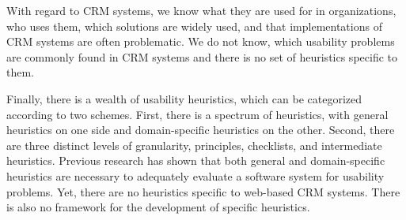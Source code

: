 With regard to CRM systems, we know what they are used for in organizations, who uses them, which solutions are widely used, and that implementations of CRM systems are often problematic. We do not know, which usability problems are commonly found in CRM systems and there is no set of heuristics specific to them.

Finally, there is a wealth of usability heuristics, which can be categorized according to two schemes. First, there is a spectrum of heuristics, with general heuristics on one side and domain-specific heuristics on the other. Second, there are three distinct levels of granularity, principles, checklists, and intermediate heuristics. Previous research has shown that both general and domain-specific heuristics are necessary to adequately evaluate a software system for usability problems. Yet, there are no heuristics specific to web-based CRM systems. There is also no framework for the development of specific heuristics.